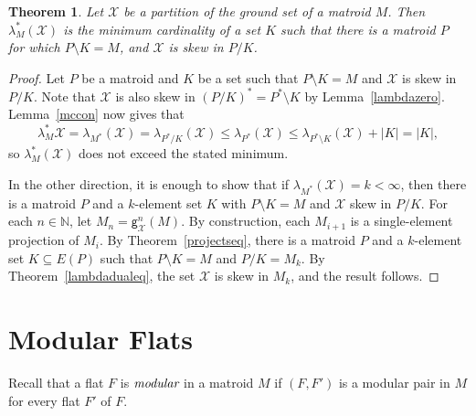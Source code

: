 \documentclass{amsart}
\theoremstyle{plain}
\newtheorem{theorem}{Theorem}[section]
\theoremstyle{definition}
\newcommand{\bN}{\mathbb N}
\newcommand{\cX}{\mathcal{X}}
\newcommand{\del}{\!\setminus\!}
\newcommand{\con}{/}
\renewcommand{\le}{\leqslant}
\renewcommand{\ss}{\subseteq}
\newcommand{\gutsproj}[3]{\mathsf{g}_{#2}^{#3}(#1)}
\begin{document}
\begin{theorem}
  Let $\cX$ be a partition of the ground set of a matroid $M$. 
  Then $\lambda_M^*(\cX)$ is the minimum cardinality of a set $K$
  such that there is a matroid $P$ for which $P \del K = M$, 
  and $\cX$ is skew in $P \con K$. 
\end{theorem}
\begin{proof}
  Let $P$ be a matroid and $K$ 
  be a set such that $P \del K = M$ and $\cX$ is skew in $P \con K$. 
  Note that $\cX$ is also skew in $(P \con K)^* = P^* \del K$ by 
  Lemma~\ref{lambdazero}. 
  Lemma~\ref{mccon} now gives that 
  \[\lambda^*_M{\cX} = \lambda_{M^*}(\cX) = \lambda_{P^* \con K}(\cX) \le \lambda_{P^*}(\cX) \le \lambda_{P^* \del K}(\cX) + |K| = |K|,\]
  so $\lambda^*_M(\cX)$ does not exceed the stated minimum. 

  In the other direction, it is enough to show that if $\lambda_{M^*}(\cX) = k < \infty$, 
  then there is a matroid $P$ and a $k$-element set $K$ with $P \del K = M$ 
  and $\cX$ skew in $P \con K$. For each $n \in \bN$, let $M_n = \gutsproj{M}{\cX}{n}$.
  By construction, each $M_{i+1}$ is a single-element projection of $M_i$.
  By Theorem~\ref{projectseq}, there is a matroid $P$ and a $k$-element set $K \ss E(P)$
  such that $P \del K = M$ and $P \con K = M_k$. 
  By Theorem~\ref{lambdadualeq}, the set $\cX$ is skew in $M_k$, and the result follows. 
\end{proof}

\section{Modular Flats}

Recall that a flat $F$ is $\emph{modular}$ in a matroid $M$ if $(F,F')$ is a modular pair in $M$ for every flat $F'$ of $F$. 
\end{document}
